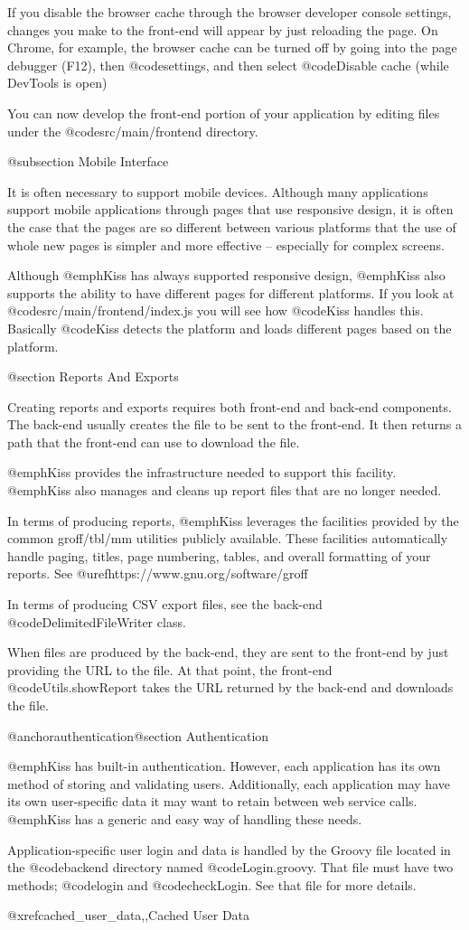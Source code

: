 If you disable the browser cache through the browser developer console
settings, changes you make to the front-end will appear by just
reloading the page.  On Chrome, for example, the browser cache can be
turned off by going into the page debugger (F12), then
@code{settings}, and then select @code{Disable cache (while DevTools
is open)}

You can now develop the front-end portion of your application by
editing files under the @code{src/main/frontend} directory.

@subsection Mobile Interface

It is often necessary to support mobile devices.  Although many
applications support mobile applications through pages that use
responsive design, it is often the case that the pages are so
different between various platforms that the use of whole new pages is
simpler and more effective -- especially for complex screens.

Although @emph{Kiss} has always supported responsive design,
@emph{Kiss} also supports the ability to have different pages for
different platforms.  If you look at @code{src/main/frontend/index.js}
you will see how @code{Kiss} handles this.  Basically @code{Kiss}
detects the platform and loads different pages based on the platform.


@section Reports And Exports

Creating reports and exports requires both front-end and back-end components.
The back-end usually creates the file to be sent to the front-end.  It then returns
a path that the front-end can use to download the file.

@emph{Kiss} provides the infrastructure needed to support this facility.
@emph{Kiss} also manages and cleans up report files that are no longer needed.

In terms of producing reports, @emph{Kiss} leverages the facilities
provided by the common groff/tbl/mm utilities publicly available.
These facilities automatically handle paging, titles, page numbering,
tables, and overall formatting of your reports. See
@uref{https://www.gnu.org/software/groff}

In terms of producing CSV export files, see the back-end
@code{DelimitedFileWriter} class.

When files are produced by the back-end, they are sent to the
front-end by just providing the URL to the file.  At that point, the
front-end @code{Utils.showReport} takes the URL returned by the back-end
and downloads the file.

@anchor{authentication}@section Authentication

@emph{Kiss} has built-in authentication.  However, each application has its
own method of storing and validating users.  Additionally, each application
may have its own user-specific data it may want to retain between web service
calls. @emph{Kiss} has a generic and easy way of handling these needs.

Application-specific user login and data is handled by the Groovy file
located in the @code{backend} directory named @code{Login.groovy}.
That file must have two methods; @code{login} and @code{checkLogin}.  
See that file for more details.

@xref{cached_user_data,,Cached User Data}
